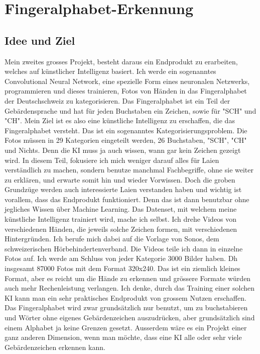 \documentclass[11pt,a4paper,ngerman]{article}
\begin{document}
\pagebreak
\section{Fingeralphabet-Erkennung}

\subsection{Idee und Ziel}

Mein zweites grosses Projekt, besteht daraus ein Endprodukt zu erarbeiten, welches auf künstlicher Intelligenz basiert. Ich werde ein sogenanntes Convolutional Neural Network, eine spezielle Form eines neuronalen Netzwerks, programmieren und dieses trainieren, Fotos von Händen in das Fingeralphabet der Deutschschweiz zu kategorisieren. Das Fingeralphabet ist ein Teil der Gebärdensprache und hat für jeden Buchstaben ein Zeichen, sowie für "SCH" und "CH". Mein Ziel ist es also eine künstliche Intelligenz zu erschaffen, die das Fingeralphabet versteht. Das ist ein sogenanntes Kategorisierungsproblem. Die Fotos müssen in 29 Kategorien eingeteilt werden, 26 Buchstaben, "SCH", "CH" und Nichts. Denn die KI muss ja auch wissen, wann gar kein Zeichen gezeigt wird. In diesem Teil, fokusiere ich mich weniger darauf alles für Laien verständlich zu machen, sondern benutze manchmal Fachbegriffe, ohne sie weiter zu erklären, und erwarte somit hin und wieder Vorwissen. Doch die groben Grundzüge werden auch interessierte Laien verstanden haben und wichtig ist vorallem, dass das Endprodukt funktioniert. Denn das ist dann benutzbar ohne jegliches Wissen über Machine Learning. Das Datenset, mit welchem meine künstliche Intelligenz trainiert wird, mache ich selbst. Ich drehe Videos von verschiedenen Händen, die jeweils solche Zeichen formen, mit verschiedenen Hintergründen. Ich berufe mich dabei auf die Vorlage von Sonos, dem schweizerischen Hörbehindertenverband. Die Videos teile ich dann in einzelne Fotos auf. Ich werde am Schluss von jeder Kategorie 3000 Bilder haben. Dh insgesamt 87000 Fotos mit dem Format 320x240. Das ist ein ziemlich kleines Format, aber es reicht um die Hände zu erkennen und grössere Formate würden auch mehr Rechenleistung verlangen. Ich denke, durch das Training einer solchen KI kann man ein sehr praktisches Endprodukt von grossem Nutzen erschaffen. Das Fingeralphabet wird zwar grundsätzlich nur benutzt, um zu buchstabieren und Wörter ohne eigenes Gebärdenzeichen auszudrücken, aber grundsätzlich sind einem Alphabet ja keine Grenzen gesetzt. Ausserdem wäre es ein Projekt einer ganz anderen Dimension, wenn man möchte, dass eine KI alle oder sehr viele Gebärdenzeichen erkennen kann. 
\end{document}
